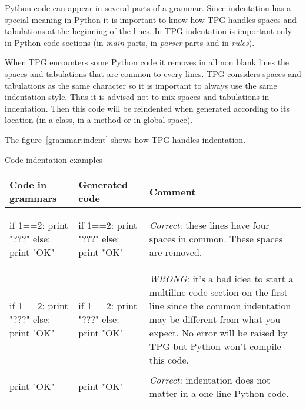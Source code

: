 Python code can appear in several parts of a grammar.
Since indentation has a special meaning in Python it is important to know how TPG handles spaces and tabulations at the beginning of the lines.
In TPG indentation is important only in Python code sections (in \emph{main} parts, in \emph{parser} parts and in \emph{rules}).

When TPG encounters some Python code it removes in all non blank lines the spaces and tabulations that are common to every lines.
TPG considers spaces and tabulations as the same character so it is important to always use the same indentation style.
Thus it is advised not to mix spaces and tabulations in indentation.
Then this code will be reindented when generated according to its location (in a class, in a method or in global space).

The figure~\ref{grammar:indent} shows how TPG handles indentation.

\begin{tableau}
\caption{Code indentation examples}							\label{grammar:indent}
\begin{tabular}{| p{5cm} | p{4cm} | p{4cm} |}
\hline
	Code in grammars & Generated code & Comment \\
\hline
\hline

	\begin{verbatim*}
{{
    if 1==2:
        print "???"
    else:
        print "OK"
}}
	\end{verbatim*}
	&
	\begin{verbatim*}

if 1==2:
    print "???"
else:
    print "OK"
	\end{verbatim*}
	&
	\emph{Correct}: these lines have four spaces in common.  These spaces are removed.
	\\

\hline

	\begin{verbatim*}
{{  if 1==2:
        print "???"
    else:
        print "OK"
}}
	\end{verbatim*}
	&
	\begin{verbatim*}
if 1==2:
      print "???"
  else:
      print "OK"
	\end{verbatim*}
	&
	\emph{WRONG}: it's a bad idea to start a multiline code section on the first line since the common indentation may be different from what you expect.  No error will be raised by TPG but Python won't compile this code.
	\\

\hline

	\begin{verbatim*}
{{       print "OK" }}
	\end{verbatim*}
	&
	\begin{verbatim*}
print "OK"
	\end{verbatim*}
	&
	\emph{Correct}: indentation does not matter in a one line Python code.
	\\

\hline

\end{tabular}
\end{tableau}

